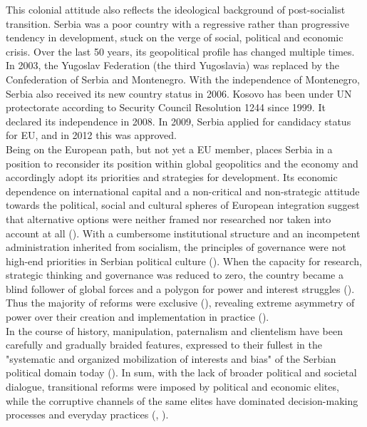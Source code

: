 \documentclass[11pt]{report}
\begin{document}
This colonial attitude also reflects the ideological background of post-socialist transition. Serbia was a poor country with a regressive rather than progressive tendency in development, stuck on the verge of social, political and economic crisis. Over the last 50 years, its geopolitical profile has changed multiple times. In 2003, the Yugoslav Federation (the third Yugoslavia) was replaced by the Confederation of Serbia and Montenegro. With the independence of Montenegro, Serbia also received its new country status in 2006. Kosovo has been under UN protectorate according to Security Council Resolution 1244 since 1999. It declared its independence in 2008. In 2009, Serbia applied for candidacy status for EU, and in 2012 this was approved. 
\\

Being on the European path, but not yet a EU member, places Serbia in a position to reconsider its position within global geopolitics and the economy and accordingly adopt its priorities and strategies for development. Its economic dependence on international capital and a non-critical and non-strategic attitude towards the political, social and cultural spheres of European integration suggest that alternative options were neither framed nor researched nor taken into account at all (\href{Vujosevic}{\citealt{vujosevic_post-socialist_2012}}).
With a cumbersome institutional structure and an incompetent administration inherited from socialism, the principles of governance were not high-end priorities in Serbian political culture  (\href{Trkulja}{\citealt{trkulja_serbian_2012}}).
When the capacity for research, strategic thinking and governance was reduced to zero, the country became a blind follower of global forces and a polygon for power and interest struggles (\href{Vujosevic}{\citealt{vujosevic_conundrum_2012}}).
Thus the majority of reforms were exclusive (\href{Vujosevic}{\citealt{vujosevic_novi_2012}}), revealing extreme asymmetry of power over their creation and implementation in practice (\href{Vujosevic}{\citealt{vujosevic_regionalizam_2015}}).
\\

In the course of history, manipulation, paternalism and clientelism have been carefully and gradually braided features, expressed to their fullest in the "systematic and organized mobilization of interests and bias" of the Serbian political domain today (\href{Vujosevic}{\citealt{vujosevic_post-socialist_2012}}).
In sum, with the lack of broader political and societal dialogue, transitional reforms were imposed by political and economic elites, while the corruptive channels of the same elites have dominated decision-making processes and everyday practices (\href{Vujosevic}{\citealt{vujosevic_conundrum_2012}}, \href{Vujosevic}{\citealt{vujosevic_novi_2012}}).%
\\
\end{document}
